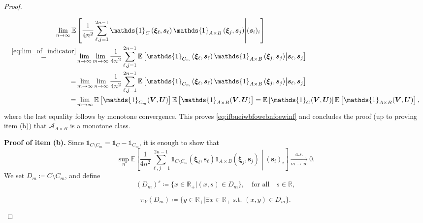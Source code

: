 \documentclass[11pt,a4paper,oneside]{article}
\theoremstyle{definition}
\theoremstyle{remark}
\def\E{\mathbb{E}}
\def\R{\mathbb{R}}
\begin{document}
\begin{proof}
\begin{itemize}
\begin{align}
\lim_{n\to \infty}\E&\left[\frac{1}{4n^2}\sum_{\ell,j=1}^{2n-1}\mathds{1}_{C}\left(\bm \xi_\ell,\bm s_\ell\right)\mathds{1}_{A\times B}\left(\bm \xi_j,\bm s_j\right)\middle| ( \bm s_i)_i\right]\\
\stackrel{\eqref{eq:lim_of_indicator}}{=} &\lim_{n\to \infty}\lim_{m\to \infty}
\frac{1}{4n^2}\sum_{\ell,j=1}^{2n-1}\E\left[\mathds{1}_{C_m}\left(\bm \xi_\ell,\bm s_\ell\right)\mathds{1}_{A\times B}\left(\bm \xi_j,\bm s_j\right)\middle|  \bm s_\ell,\bm s_j\right]\\
= &\lim_{m\to \infty}\lim_{n\to \infty}
\frac{1}{4n^2}\sum_{\ell,j=1}^{2n-1}\E\left[\mathds{1}_{C_m}\left(\bm \xi_\ell,\bm s_\ell\right)\mathds{1}_{A\times B}\left(\bm \xi_j,\bm s_j\right)\middle|  \bm s_\ell,\bm s_j\right]\\
=
&\lim_{m\to \infty}\E\left[\mathds{1}_{C_m}(\bm V,\bm U)\right]\E\left[\mathds{1}_{A \times B}(\bm V,\bm U)\right]=\E\left[\mathds{1}_{C}(\bm V,\bm U)\right]\E\left[\mathds{1}_{A \times B}(\bm V,\bm U)\right],
\end{align}
where the last equality follows by monotone convergence. This proves \cref{eq:ifbueiwbfowebnfoewinf} and concludes the proof (up to proving item (b)) that $\mathcal{A}_{A\times B}$ is a monotone class.

\textbf{Proof of  item (b). }Since $\mathds{1}_{C\setminus C_m}=\mathds{1}_{C}-\mathds{1}_{C_m}$, it is enough to show that
\begin{equation}
\sup_{n}\E\left[\frac{1}{4n^2}\sum_{\ell,j=1}^{2n-1}\mathds{1}_{C\setminus C_m}\left(\bm \xi_\ell,\bm s_\ell\right)\mathds{1}_{A\times B}\left(\bm \xi_j,\bm s_j\right)\middle| ( \bm s_i)_i\right]\xrightarrow[m\to\infty]{a.s.}0.
\end{equation}
We set $D_m\coloneqq C\setminus C_m$, and define 
$$(D_m)^{s}\coloneqq\{x\in \R_+|(x,s)\in D_m\},\quad \text{for all} \quad s\in\R,$$
 
$$\pi_Y(D_m)\coloneqq\{y\in \R_+| \exists x\in \R_+ \text{ s.t. }(x,y)\in D_m\}.$$ 


\end{itemize}
\end{proof}
\end{document}
